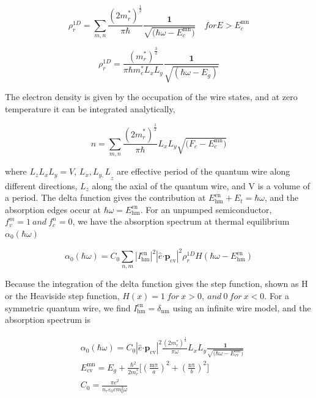 \begin{equation}
\rho_{r}^{1D} = \sum_{m,n}^{}{\frac{\left( {2m}_{r}^{*} \right)^{\frac{1}{2}}}{\pi\hbar}\frac{\bm{1}}{\sqrt{\bm{(}\hbar\omega - E_{c}^{\text{mn}}\bm{)}}}} \quad
for {E > E}_{c}^{\text{mn}}
\end{equation}

\begin{equation}
  \rho_{r}^{1D} = \frac{\left( m_{r}^{*} \right)^{\frac{3}{2}}}{\pi{\hbar}m_{e}^{*}L_{x}L_{y}}\frac{\bm{1}}{\sqrt{(\hbar\omega - E_{g})}}
\end{equation}

The electron density is given by the occupation of the wire states, and
at zero temperature it can be integrated analytically,

\begin{equation}
n = \sum_{m,n}^{}{\frac{\left( {2m}_{r}^{*} \right)^{\frac{1}{2}}}{\pi\hbar}L_{x}L_{y}}\sqrt{\bm{(}F_{c} - E_{c}^{\text{mn}}\bm{)}}
\end{equation}

where \(L_{z}L_{x}L_{y} = V\), \({L_{x},L_{y,}L}_{z}\) are effective
period of the quantum wire along different directions, \(L_{z}\) along
the axial of the quantum wire, and V is a volume of a period. The delta
function gives the contribution at
\(E_{\text{hm}}^{\text{en}} + E_{t} = \hbar\omega\), and the
absorption edges occur at \(\hbar\omega = E_{\text{hm}}^{\text{en}}\).
For an unpumped semiconductor, \(f_{v}^{m} = 1\ and\ f_{c}^{n} = 0\), we
have the absorption spectrum at thermal equilibrium
\(\alpha_{0}\left( \hbar\omega \right)\)

\begin{equation}
\alpha_{0}\left( \hbar\omega \right) = C_{0}\sum_{n,m}^{}\left| I_{\text{hm}}^{\text{en}} \right|^{2}\left| \hat{e}\bm{\cdot}\bm{p}_{\text{cv}} \right|^{2}\rho_{r}^{1D}H(\hbar\omega - E_{\text{hm}}^{\text{en}})
\end{equation}

Because the integration of the delta function gives the step function,
shown as H or the Heaviside step function,
\(H\left( x \right) = 1\ for\ x > 0,\ and\ 0\ for\ x < 0\). For a
symmetric quantum wire, we find
\(I_{\text{hm}}^{\text{en}} = \delta_{\text{nm}}\) using an infinite
wire model, and the absorption spectrum is

\begin{eqnarray}
  & \alpha_{0}\left( \hbar\omega \right) = C_{0}\left| \hat{e}\bm{\cdot}\bm{p}_{\text{cv}} \right|^{2}\frac{\left( 2m_{r}^{*} \right)^{\frac{1}{2}}}{\pi\omega}L_{x}L_{y}\frac{\bm{1}}{\sqrt{\bm{(}\hbar\omega - E_{\text{cv}}^{\text{mn}}\bm{)}}} \nonumber \\
  & E_{\text{cv}}^{\text{mn}} = E_{g} + \frac{\hbar^{2}}{2m_{r}^{*}}\lbrack\left( \frac{\text{mπ}}{a} \right)^{2} + \left( \frac{\text{nπ}}{b} \right)^{2}\rbrack \nonumber \\
  & C_{0} = \frac{\pi e^{2}}{n_{r}\varepsilon_{0}cm_{0}^{2}\omega}
\end{eqnarray}

